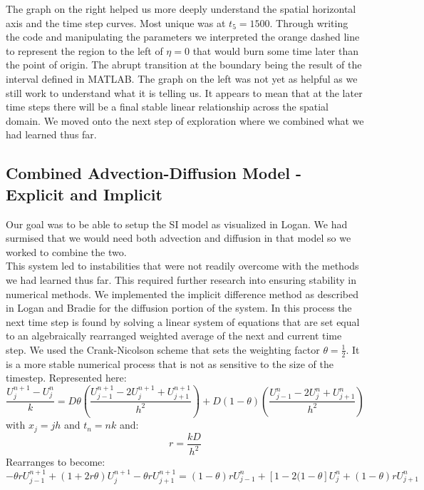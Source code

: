 \documentclass{article}
\begin{document}
\vspace{.5cm}

The graph on the right helped us more deeply understand the spatial horizontal axis and the time step curves.  Most unique was at $t_5=1500$. Through writing the code and manipulating the parameters we interpreted the orange dashed line to represent the region to the left of $\eta=0$ that would burn some time later than the point of origin.  The abrupt transition at the boundary being the result of the interval defined in MATLAB.  The graph on the left was not yet as helpful as we still work to understand what it is telling us.  It appears to mean that at the later time steps there will be a final stable linear relationship across the spatial domain.  We moved onto the next step of exploration where we combined what we had learned thus far.
\subsection{Combined Advection-Diffusion Model - Explicit and Implicit}
Our goal was to be able to setup the SI model as visualized in Logan.  We had surmised that we would need both advection and diffusion in that model so we worked to combine the two.
\\
This system led to instabilities that were not readily overcome with the methods we had learned thus far.  This required further research into ensuring stability in numerical methods.  We implemented the implicit difference method as described in Logan\supercite{logan} and Bradie\supercite{bradie} for the diffusion portion of the system. In this process the next time step is found by solving a linear system of equations that are set equal to an algebraically rearranged weighted average of the next and current time step. We used the Crank-Nicolson scheme that sets the weighting factor $\theta=\frac{1}{2}$. It is a more stable numerical process that is not as sensitive to the size of the timestep. Represented here:\\
$$\frac{U_j^{n+1}-U_j^n}{k}=D\theta\left(\frac{U^{n+1}_{j-1}-2U_j^{n+1}+U_{j+1}^{n+1}}{h^2}\right)+D(1-\theta)\left(\frac{U^n_{j-1}-2U_j^n+U_{j+1}^n}{h^2}\right)$$
with $x_j=jh$ and $t_n=nk$ and:
$$r=\frac{kD}{h^2}$$
Rearranges to become:
$$-\theta r U_{j-1}^{n+1}+(1+2r\theta)U_j^{n+1}-\theta rU_{j+1}^{n+1}=(1-\theta)rU_{j-1}^n+[1-2(1-\theta]U_j^n+(1-\theta)rU_{j+1}^n$$
\end{document}
